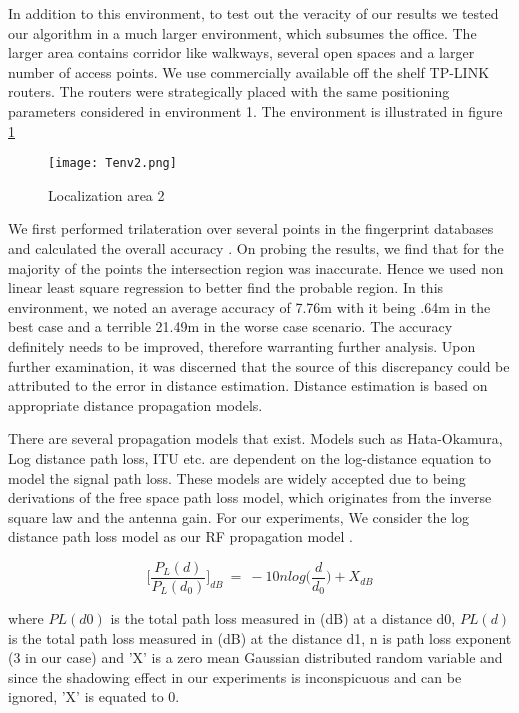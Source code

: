 In addition to this environment, to test out the veracity of our results we tested our algorithm in a much larger environment, which subsumes the office. The larger area contains corridor like walkways, several open spaces and a larger number of access points. We use commercially available off the shelf TP-LINK routers. The routers were strategically placed with the same positioning parameters considered in environment 1. The environment is illustrated in figure \ref{fig:tenv2}

\begin{figure}[h]
\texttt{[image: Tenv2.png]}
\caption{ Localization area 2 }
\label{fig:tenv2}
\end{figure}

We first performed trilateration over several points in the fingerprint databases and calculated the overall accuracy \cite{shanmugaapriyan2014pragmatic}. On probing the results, we find that for the majority of the points the intersection region was inaccurate. Hence we used non linear least square regression to better find the probable region. In this environment, we noted an average accuracy of 7.76m with it being .64m in the best case and a terrible 21.49m in the worse case scenario. 
The accuracy definitely needs to be improved, therefore warranting further analysis. Upon further examination, it was discerned that the source of this discrepancy could be attributed to the error in distance estimation. Distance estimation is based on appropriate distance propagation models.

There are several propagation models that exist. Models such as Hata-Okamura, Log distance path loss, ITU etc. are dependent on the log-distance equation to model the signal path loss. These models are widely accepted due to being derivations of the free space path loss model, which originates from the inverse square law and the antenna gain. For our experiments, We consider the log distance path loss model as our RF propagation model \cite{sarkar2003survey, soorty2015finding}.

\begin{equation}
\Bigg[\frac{P_{L}(d)}{P_{L}(d_{0})}\Bigg]_{dB}  ~=~ -10n log\Bigg(\frac{d}{d_{0}}\Bigg) + X_{dB}
\label{pathlosseqn}
\end{equation}

where $PL(d0)$ is the total path loss measured in (dB) at a distance d0, $PL(d)$ is the total path loss measured in (dB) at the distance d1, n is path loss exponent (3 in our case) and 'X' is a zero mean Gaussian distributed random variable and since the shadowing effect in our experiments is inconspicuous and can be ignored, 'X' is equated to 0.

